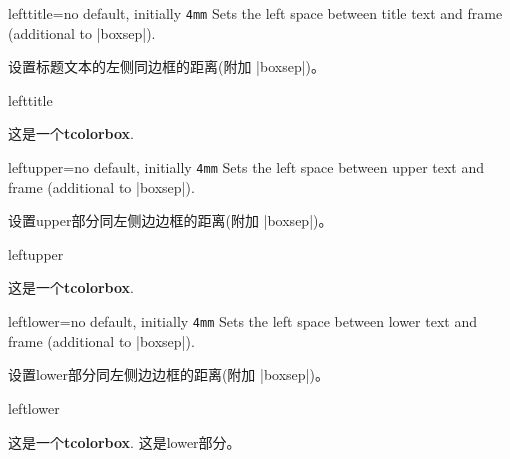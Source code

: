 


\begin{docTcbKey}{lefttitle}{=}{no default, initially \texttt{4mm}}
  Sets the left space between title text and frame (additional to |boxsep|).

设置标题文本的左侧同边框的距离(附加 |boxsep|)。
\begin{exdispExample}{lefttitle}

\begin{tcolorbox}[lefttitle=3cm,title=My Title]
这是一个\textbf{tcolorbox}.
\end{tcolorbox}
\end{exdispExample}
\end{docTcbKey}


\begin{docTcbKey}{leftupper}{=}{no default, initially \texttt{4mm}}
  Sets the left space between upper text and frame (additional to |boxsep|).

设置upper部分同左侧边边框的距离(附加 |boxsep|)。
\begin{exdispExample}{leftupper}

\begin{tcolorbox}[leftupper=3cm,title=My Title]
这是一个\textbf{tcolorbox}.
\end{tcolorbox}
\end{exdispExample}
\end{docTcbKey}

\begin{docTcbKey}{leftlower}{=}{no default, initially \texttt{4mm}}
  Sets the left space between lower text and frame (additional to |boxsep|).

设置lower部分同左侧边边框的距离(附加 |boxsep|)。
\begin{exdispExample}{leftlower}

\begin{tcolorbox}[leftlower=3cm]
这是一个\textbf{tcolorbox}.
\tcblower
这是lower部分。
\end{tcolorbox}
\end{exdispExample}
\end{docTcbKey}

